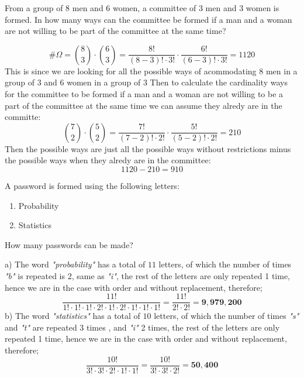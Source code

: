 \documentclass{article}
\begin{document}
        \begin{solutions}
            From a group of 8 men and 6 women, a committee of 3 men and 3 women is formed. In how many ways can the committee be formed if a man and a woman are not willing to be part of the committee at the same time? \par

            \[ 
                \#\Omega = \binom{8}{3} \cdot \binom{6}{3} = \frac{8!}{(8 - 3)! \cdot 3!} \cdot \frac{6!}{(6 - 3)! \cdot 3!} = 1120
                
            \]
            This is since we are looking for all the possible ways of acommodating 8 men in a group of 3 and 6 women in a group of 3 
            Then to calculate the cardinality ways for the committee to be formed if a man and a woman are not willing to be a part of the committee at the same time we can assume they alredy are in the committe:
            \[ 
            \binom{7}{2} \cdot \binom{5}{2} = \frac{7!}{(7 - 2)! \cdot 2!} \cdot \frac{5!}{(5 - 2)! \cdot 2!} = 210
            \]
            Then the possible ways are just all the possible ways without restrictions minus the possible ways when they alredy are in the committee:
            \[ 
                1120 - 210 = 910
            \]
            \noindent 
            \bigskip
            \bigskip
        \end{solutions}
        
        \begin{samepage}
        \begin{solutions}
            A password is formed using the following letters:
            \begin{enumerate}[label=\alph*)]
                \item Probability
                \item Statistics
            \end{enumerate} 
            How many passwords can be made? \par
            \bigskip
            \noindent a) The word \textit{"probability"} has a total of $11$ letters, of which the number of times \textit{"b"} is repeated is 2, same as \textit{"i"}, the rest of the letters are only repeated 1 time, hence we are in the case with order and without replacement, therefore;
            \[
                \frac{11!}{1!\cdot1!\cdot1!\cdot2!\cdot1!\cdot2!\cdot1!\cdot1!\cdot1!} = \frac{11!}{2!\cdot2!} = \mathbf{9, 979, 200}
            \]
            b) The word \textit{"statistics"} has a total of $10$ letters, of which the number of times \textit{"s"} and \textit{"t"} are repeated 3 times , and \textit{"i"} 2 times, the rest of the letters are only repeated 1 time, hence we are in the case with order and without replacement, therefore;
            \[
                \frac{10!}{3!\cdot3!\cdot2!\cdot1!\cdot1!} = \frac{10!}{3!\cdot3!\cdot2!} = \mathbf{50, 400}
            \]
            \medskip
        \end{solutions}
        \end{samepage}
\end{document}

